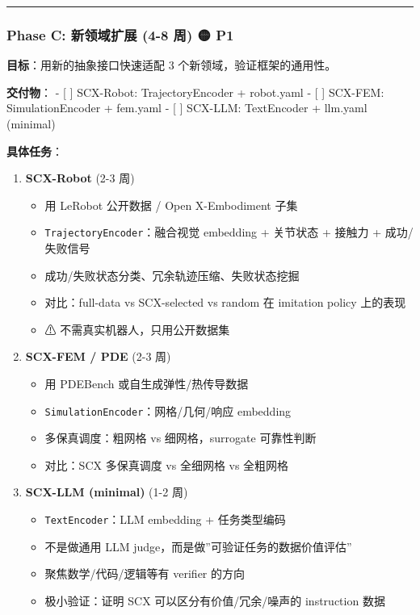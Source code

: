 \documentclass[
  12pt,
]{ctexart}
\providecommand{\tightlist}{%
  \setlength{\itemsep}{0pt}\setlength{\parskip}{0pt}}
\begin{document}
\begin{center}\rule{0.5\linewidth}{0.5pt}\end{center}

\subsubsection{Phase C: 新领域扩展 (4-8 周) 🟡
P1}\label{phase-c-ux65b0ux9886ux57dfux6269ux5c55-4-8-ux5468-p1}

\textbf{目标}：用新的抽象接口快速适配 3 个新领域，验证框架的通用性。

\textbf{交付物}： - {[} {]} SCX-Robot: TrajectoryEncoder + robot.yaml -
{[} {]} SCX-FEM: SimulationEncoder + fem.yaml - {[} {]} SCX-LLM:
TextEncoder + llm.yaml (minimal)

\textbf{具体任务}：

\begin{enumerate}
\def\labelenumi{\arabic{enumi}.}
\tightlist
\item
  \textbf{SCX-Robot} (2-3 周)

  \begin{itemize}
  \tightlist
  \item
    用 LeRobot 公开数据 / Open X-Embodiment 子集
  \item
    \texttt{TrajectoryEncoder}：融合视觉 embedding + 关节状态 + 接触力 +
    成功/失败信号
  \item
    成功/失败状态分类、冗余轨迹压缩、失败状态挖掘
  \item
    对比：full-data vs SCX-selected vs random 在 imitation policy
    上的表现
  \item
    ⚠ 不需真实机器人，只用公开数据集
  \end{itemize}
\item
  \textbf{SCX-FEM / PDE} (2-3 周)

  \begin{itemize}
  \tightlist
  \item
    用 PDEBench 或自生成弹性/热传导数据
  \item
    \texttt{SimulationEncoder}：网格/几何/响应 embedding
  \item
    多保真调度：粗网格 vs 细网格，surrogate 可靠性判断
  \item
    对比：SCX 多保真调度 vs 全细网格 vs 全粗网格
  \end{itemize}
\item
  \textbf{SCX-LLM (minimal)} (1-2 周)

  \begin{itemize}
  \tightlist
  \item
    \texttt{TextEncoder}：LLM embedding + 任务类型编码
  \item
    不是做通用 LLM judge，而是做''可验证任务的数据价值评估''
  \item
    聚焦数学/代码/逻辑等有 verifier 的方向
  \item
    极小验证：证明 SCX 可以区分有价值/冗余/噪声的 instruction 数据
  \end{itemize}
\end{enumerate}
\end{document}
